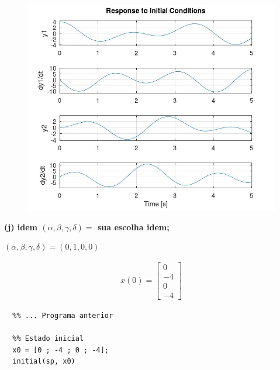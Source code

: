 \documentclass[11pt]{article}
\begin{document}
\begin{center}
  \begin{figure}[h]
    \centering
    \includegraphics[scale=0.5]{plot2i.jpg}
  \end{figure}
\end{center}

\newpage

\textbf{(j) idem $(\alpha, \beta, \gamma, \delta) = $ sua escolha idem;}

$(\alpha, \beta, \gamma, \delta) = (0, 1, 0, 0)$

\begin{align*}
  x(0) =
  \begin{bmatrix}
    0 \\
    -4\\
    0\\
    -4
  \end{bmatrix}
\end{align*}

\begin{verbatim}
  %% ... Programa anterior

  %% Estado inicial
  x0 = [0 ; -4 ; 0 ; -4];
  initial(sp, x0)
\end{verbatim}
\end{document}
